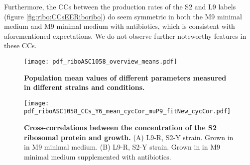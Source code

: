 Furthermore, the CCs between the production rates of the S2 and L9 labels (figure \ref{fig:ribo:CCsEERiboribo}) do seem symmetric in both the M9 minimal medium and M9 minimal medium with antibiotics, which is consistent with aforementioned expectations.
We do not observe further noteworthy features in these CCs.




\begin{figure}
    \centering
    \texttt{[image: pdf\_riboASC1058\_overview\_means.pdf]}
    \caption{ 
        \textbf{Population mean values of different parameters measured in different strains and conditions.}
    }
    \label{fig:ribo:meansRR}
\end{figure}


\begin{figure}
    \centering
    \texttt{[image: pdf\_riboASC1058\_CCs\_Y6\_mean\_cycCor\_muP9\_fitNew\_cycCor.pdf]}
    \caption{ 
        \textbf{Cross-correlations between the concentration of the S2 ribosomal protein and growth.}
        (A) L9-R, S2-Y strain. Grown in in M9 minimal medium.
        (B) L9-R, S2-Y strain. Grown in in M9 minimal medium supplemented with antibiotics. 
    }
    \label{fig:ribo:CCsEmuS2}
\end{figure}

